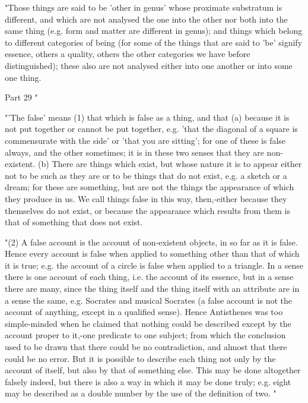 "Those things are said to be 'other in genus' whose proximate substratum
is different, and which are not analysed the one into the other nor
both into the same thing (e.g. form and matter are different in genus);
and things which belong to different categories of being (for some
of the things that are said to 'be' signify essence, others a quality,
others the other categories we have before distinguished); these also
are not analysed either into one another or into some one thing.

Part 29 "

"'The false' means (1) that which is false as a thing, and that (a)
because it is not put together or cannot be put together, e.g. 'that
the diagonal of a square is commensurate with the side' or 'that you
are sitting'; for one of these is false always, and the other sometimes;
it is in these two senses that they are non-existent. (b) There are
things which exist, but whose nature it is to appear either not to
be such as they are or to be things that do not exist, e.g. a sketch
or a dream; for these are something, but are not the things the appearance
of which they produce in us. We call things false in this way, then,-either
because they themselves do not exist, or because the appearance which
results from them is that of something that does not exist.

"(2) A false account is the account of non-existent objects, in so
far as it is false. Hence every account is false when applied to something
other than that of which it is true; e.g. the account of a circle
is false when applied to a triangle. In a sense there is one account
of each thing, i.e. the account of its essence, but in a sense there
are many, since the thing itself and the thing itself with an attribute
are in a sense the same, e.g. Socrates and musical Socrates (a false
account is not the account of anything, except in a qualified sense).
Hence Antisthenes was too simple-minded when he claimed that nothing
could be described except by the account proper to it,-one predicate
to one subject; from which the conclusion used to be drawn that there
could be no contradiction, and almost that there could be no error.
But it is possible to describe each thing not only by the account
of itself, but also by that of something else. This may be done altogether
falsely indeed, but there is also a way in which it may be done truly;
e.g. eight may be described as a double number by the use of the definition
of two. "


